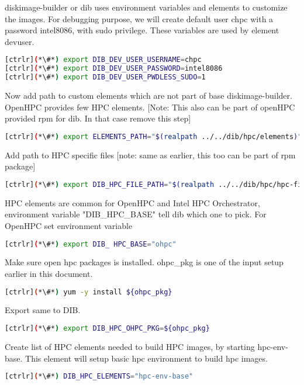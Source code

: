 diskimage-builder or dib uses environment variables and elements to customize the images. For debugging purpose, we will create default user chpc with a password intel8086, with sudo privilege. These variables are used by element devuser. 

\begin{lstlisting}[language=bash,keywords={}]
[ctrlr](*\#*) export DIB_DEV_USER_USERNAME=chpc
[ctrlr](*\#*) export DIB_DEV_USER_PASSWORD=intel8086
[ctrlr](*\#*) export DIB_DEV_USER_PWDLESS_SUDO=1
\end{lstlisting}

Now add path to custom elements which are not part of base diskimage-builder. OpenHPC provides few HPC elements. [Note: This also can be part of openHPC provided rpm for dib. In that case remove this step]

\begin{lstlisting}[language=bash,keywords={}]
[ctrlr](*\#*) export ELEMENTS_PATH="$(realpath ../../dib/hpc/elements)"
\end{lstlisting}

Add path to HPC specific files [note: same as earlier, this too can be part of rpm package]

\begin{lstlisting}[language=bash,keywords={}]
[ctrlr](*\#*) export DIB_HPC_FILE_PATH="$(realpath ../../dib/hpc/hpc-files/)"
\end{lstlisting}

HPC elements are common for OpenHPC and Intel HPC Orchestrator, environment variable "DIB\_HPC\_BASE" tell dib which one to pick. For OpenHPC set environment variable


\begin{lstlisting}[language=bash,keywords={}]
[ctrlr](*\#*) export DIB_ HPC_BASE="ohpc"
\end{lstlisting}

Make sure open hpc packages is installed. ohpc\_pkg is one of the input setup earlier in this document.

\begin{lstlisting}[language=bash,keywords={}]
[ctrlr](*\#*) yum -y install ${ohpc_pkg}
\end{lstlisting}

Export same to DIB.

\begin{lstlisting}[language=bash,keywords={}]
[ctrlr](*\#*) export DIB_HPC_OHPC_PKG=${ohpc_pkg}
\end{lstlisting}

Create list of HPC elements needed to build HPC images, by starting hpc-env-base. This element will setup basic hpc environment to build hpc images.

\begin{lstlisting}[language=bash,keywords={}]
[ctrlr](*\#*) DIB_HPC_ELEMENTS="hpc-env-base"
\end{lstlisting}